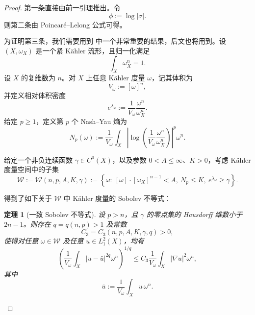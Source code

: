 \documentclass[12pt,a4paper]{article}
\newtheorem{theorem}{定理}[section]
\begin{document}
\begin{proof}
第一条直接由前一引理推出。令
\[
\phi:=\log|\sigma|.
\]
则第二条由 Poincar\'e--Lelong 公式可得。

为证明第三条，我们需要用到 \cite{GuoSobolev} 中一个非常重要的结果，后文也将用到。设 \((X,\omega_X)\) 是一个紧 Kähler 流形，且归一化满足
\[
\int_X \omega_X^n=1.
\]
设 \(X\) 的复维数为 \(n\)。对 \(X\) 上任意 Kähler 度量 \(\omega\)，记其体积为
\[
V_\omega:=[\omega]^n,
\]
并定义相对体积密度
\[
e^{\lambda_\omega}
:=
\frac{1}{V_\omega}\frac{\omega^n}{\omega_X^n}.
\]
给定 \(p\ge 1\)，定义第 \(p\) 个 Nash--Yau 熵为
\[
N_p(\omega)
:=
\frac1{V_\omega}
\int_X
\left|
\log\left(\frac1{V_\omega}\frac{\omega^n}{\omega_X^n}\right)
\right|^p\omega^n.
\]

给定一个非负连续函数 \(\gamma\in C^0(X)\)，以及参数 \(0<A\le \infty\)、\(K>0\)，考虑 Kähler 度量空间中的子集
\[
\mathcal W:=\mathcal W(n,p,A,K,\gamma)
:=
\left\{
\omega:\ [\omega]\cdot [\omega_X]^{n-1}<A,\ N_p\le K,\ e^{\lambda_\omega}\ge \gamma
\right\}.
\]

\cite[Theorem 2.1]{GuoSobolev} 得到了如下关于 \(\mathcal W\) 中 Kähler 度量的 Sobolev 不等式：

\begin{theorem}[一致 Sobolev 不等式]
设 \(p>n\)，且 \(\gamma\) 的零点集的 Hausdorff 维数小于 \(2n-1\)。则存在 \(q=q(n,p)>1\) 及常数
\[
C_3=C_3(n,p,A,K,\gamma,q)>0,
\]
使得对任意 \(\omega\in\mathcal W\) 及任意 \(u\in L_1^2(X)\)，均有
\[
\left(
\frac1{V_\omega}\int_X |u-\bar u|^{2q}\omega^n
\right)^{1/q}
\le
C_3\frac1{V_\omega}\int_X |\nabla u|^2\omega^n,
\]
其中
\[
\bar u:=\frac1{V_\omega}\int_X u\,\omega^n.
\]
\end{theorem}


\end{proof}
\end{document}
